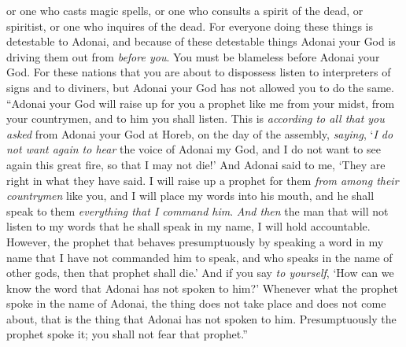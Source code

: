 \begin{biblechapter}
\verse or one who casts magic spells, or one who consults a spirit of the dead, or spiritist, or one who inquires of the dead.
\verse For everyone doing these things is detestable to Adonai, and because of these detestable things Adonai your God is driving them out from \textit{before you}.
\verse You must be blameless before Adonai your God.
\verse For these nations that you are about to dispossess listen to interpreters of signs and to diviners, but Adonai your God has not allowed you to do the same.
\verse “Adonai your God will raise up for you a prophet like me from your midst, from your countrymen, and to him you shall listen.
\verse This is \textit{according to all that you asked} from Adonai your God at Horeb, on the day of the assembly, \textit{saying}, ‘\textit{I do not want again to hear} the voice of Adonai my God, and I do not want to see again this great fire, so that I may not die!’
\verse And Adonai said to me, ‘They are right in what they have said.
\verse I will raise up a prophet for them \textit{from among their countrymen} like you, and I will place my words into his mouth, and he shall speak to them \textit{everything that I command him}.
\verse \textit{And then} the man that will not listen to my words that he shall speak in my name, I will hold accountable.
\verse However, the prophet that behaves presumptuously by speaking a word in my name that I have not commanded him to speak, and who speaks in the name of other gods, then that prophet shall die.’
\verse And if you say \textit{to yourself}, ‘How can we know the word that Adonai has not spoken to him?’
\verse Whenever what the prophet spoke in the name of Adonai, the thing does not take place and does not come about, that is the thing that Adonai has not spoken to him. Presumptuously the prophet spoke it; you shall not fear that prophet.”
\end{biblechapter}

